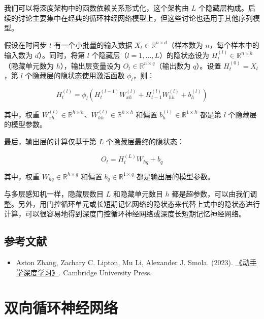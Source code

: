 我们可以将深度架构中的函数依赖关系形式化，这个架构由 \(L\) 个隐藏层构成。后续的讨论主要集中在经典的循环神经网络模型上，但这些讨论也适用于其他序列模型。

假设在时间步 \(t\) 有一个小批量的输入数据 \(X_t \in \mathbb{R}^{n \times d}\)（样本数为 \(n\)，每个样本中的输入数为 \(d\)）。同时，将第 \(l\) 个隐藏层（\(l = 1, \ldots, L\)）的隐状态设为 \(H_t^{(l)} \in \mathbb{R}^{n \times h}\)（隐藏单元数为 \(h\)），输出层变量设为 \(O_t \in \mathbb{R}^{n \times q}\)（输出数为 \(q\)）。设置 \(H_t^{(0)} = X_t\)，第 \(l\) 个隐藏层的隐状态使用激活函数 \(\phi_l\)，则：

\[
H_t^{(l)} = \phi_l(H_t^{(l-1)}W_{xh}^{(l)} + H_{t-1}^{(l)}W_{hh}^{(l)} + b_h^{(l)})
\]

其中，权重 \(W_{xh}^{(l)} \in \mathbb{R}^{h \times h}\)、\(W_{hh}^{(l)} \in \mathbb{R}^{h \times h}\) 和偏置 \(b_h^{(l)} \in \mathbb{R}^{1 \times h}\) 都是第 \(l\) 个隐藏层的模型参数。

最后，输出层的计算仅基于第 \(L\) 个隐藏层最终的隐状态：

\[
O_t = H_t^{(L)}W_{hq} + b_q
\]

其中，权重 \(W_{hq} \in \mathbb{R}^{h \times q}\) 和偏置 \(b_q \in \mathbb{R}^{1 \times q}\) 都是输出层的模型参数。

与多层感知机一样，隐藏层数目 \(L\) 和隐藏单元数目 \(h\) 都是超参数，可以由我们调整。另外，用门控循环单元或长短期记忆网络的隐状态来代替上式中的隐状态进行计算，可以很容易地得到深度门控循环神经网络或深度长短期记忆神经网络。

\hypertarget{ux53c2ux8003ux6587ux732e-20}{%
\subsection{参考文献}\label{ux53c2ux8003ux6587ux732e-20}}

\begin{itemize}
\tightlist
\item
  Aston Zhang, Zachary C. Lipton, Mu Li, Alexander J. Smola. (2023). \href{https://zh.d2l.ai/}{《动手学深度学习》}. Cambridge University Press.
\end{itemize}

\clearpage

\hypertarget{ux53ccux5411ux5faaux73afux795eux7ecfux7f51ux7edc}{%
\section{双向循环神经网络}\label{ux53ccux5411ux5faaux73afux795eux7ecfux7f51ux7edc}}

